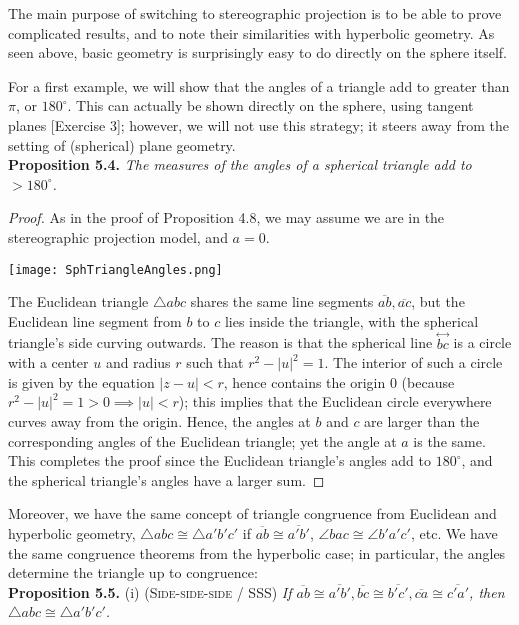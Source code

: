 \documentclass[leqno]{book}
\begin{document}
The main purpose of switching to stereographic projection is to be able to prove complicated results, and to note their similarities with hyperbolic geometry.  As seen above, basic geometry is surprisingly easy to do directly on the sphere itself.

For a first example, we will show that the angles of a triangle add to greater than $\pi$, or $180^\circ$.  This can actually be shown directly on the sphere, using tangent planes [Exercise 3]; however, we will not use this strategy; it steers away from the setting of (spherical) plane geometry.\\

\noindent\textbf{Proposition 5.4.} \emph{The measures of the angles of a spherical triangle add to $>180^\circ$.}
\begin{proof}
As in the proof of Proposition 4.8, we may assume we are in the stereographic projection model, and $a=0$.
\begin{center}
\texttt{[image: SphTriangleAngles.png]}
\end{center}
The Euclidean triangle $\triangle abc$ shares the same line segments $\overline{ab},\overline{ac}$, but the Euclidean line segment from $b$ to $c$ lies inside the triangle, with the spherical triangle's side curving outwards.  The reason is that the spherical line $\overset{\longleftrightarrow}{bc}$ is a circle with a center $u$ and radius $r$ such that $r^2-|u|^2=1$.  The interior of such a circle is given by the equation $|z-u|<r$, hence contains the origin $0$ (because $r^2-|u|^2=1>0\implies|u|<r$); this implies that the Euclidean circle everywhere curves away from the origin.  Hence, the angles at $b$ and $c$ are larger than the corresponding angles of the Euclidean triangle; yet the angle at $a$ is the same.  This completes the proof since the Euclidean triangle's angles add to $180^\circ$, and the spherical triangle's angles have a larger sum.
\end{proof}

\noindent Moreover, we have the same concept of triangle congruence from Euclidean and hyperbolic geometry, $\triangle abc\cong\triangle a'b'c'$ if $\overline{ab}\cong\overline{a'b'}$, $\angle bac\cong\angle b'a'c'$, etc.  We have the same congruence theorems from the hyperbolic case; in particular, the angles determine the triangle up to congruence:\\

\noindent\textbf{Proposition 5.5.} (i) \textsc{(Side-side-side / SSS)} \emph{If $\overline{ab}\cong\overline{a'b'},\overline{bc}\cong\overline{b'c'},\overline{ca}\cong\overline{c'a'}$, then $\triangle abc\cong\triangle a'b'c'$.}
\end{document}
